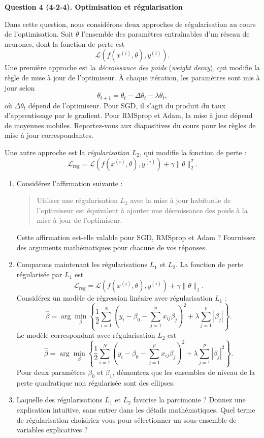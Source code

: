 \documentclass[12pt]{article}
\newif\ifsolution
\theoremstyle{definition}
\newcommand{\Answer}[1]{%
  \ifsolution
    {\color{answer}#1}%
  \fi
}
\newcommand{\question}[2]{\par\medskip\noindent\textbf{Question #1. #2}\par\medskip}
\begin{document}
\Answer{

}

\question{4 (4-2-4)}{Optimisation et régularisation}
Dans cette question, nous considérons deux approches de régularisation au cours de l'optimisation. Soit $\theta$ l'ensemble des paramètres entraînables d'un réseau de neurones, dont la fonction de perte est
\[\mathcal L(f(x^{(i)},\theta),y^{(i)}).\]
Une première approche est la \textit{décroissance des poids} (\textit{weight decay}), qui modifie la règle de mise à jour de l'optimiseur. À chaque itération, les paramètres sont mis à jour selon
\[\theta_{t+1}=\theta_t-\Delta\theta_t-\lambda\theta_t,\]
où $\Delta\theta_t$ dépend de l'optimiseur. Pour SGD, il s'agit du produit du taux d'apprentissage par le gradient. Pour RMSprop et Adam, la mise à jour dépend de moyennes mobiles. Reportez-vous aux diapositives du cours pour les règles de mise à jour correspondantes.

Une autre approche est la \textit{régularisation $L_2$}, qui modifie la fonction de perte :
\[\mathcal L_{\mathrm{reg}}=\mathcal L(f(x^{(i)},\theta),y^{(i)})+\gamma\|\theta\|_2^2.\]
\begin{enumerate}
\item Considérez l'affirmation suivante :
\begin{quote}\og Utiliser une régularisation $L_2$ avec la mise à jour habituelle de l'optimiseur est équivalent à ajouter une décroissance des poids à la mise à jour de l'optimiseur.\fg\end{quote}
Cette affirmation est-elle valable pour SGD, RMSprop et Adam ? Fournissez des arguments mathématiques pour chacune de vos réponses.
\item Comparons maintenant les régularisations $L_1$ et $L_2$. La fonction de perte régularisée par $L_1$ est
\[\mathcal L_{\mathrm{reg}}=\mathcal L(f(x^{(i)},\theta),y^{(i)})+\gamma\|\theta\|_1.\]
Considérez un modèle de régression linéaire avec régularisation $L_1$ :
\[
\hat\beta=\arg\min_{\beta}\left\{\frac12\sum_{i=1}^{N}\left(y_i-\beta_0-\sum_{j=1}^{p}x_{ij}\beta_j\right)^2+\lambda\sum_{j=1}^{p}|\beta_j|\right\}.
\]
Le modèle correspondant avec régularisation $L_2$ est
\[
\hat\beta=\arg\min_{\beta}\left\{\frac12\sum_{i=1}^{N}\left(y_i-\beta_0-\sum_{j=1}^{p}x_{ij}\beta_j\right)^2+\lambda\sum_{j=1}^{p}|\beta_j|^2\right\}.
\]
Pour deux paramètres $\beta_0$ et $\beta_1$, démontrez que les ensembles de niveau de la perte quadratique non régularisée sont des ellipses.
\item Laquelle des régularisations $L_1$ et $L_2$ favorise la parcimonie ? Donnez une explication intuitive, sans entrer dans les détails mathématiques. Quel terme de régularisation choisiriez-vous pour sélectionner un sous-ensemble de variables explicatives ?
\end{enumerate}
\end{document}
